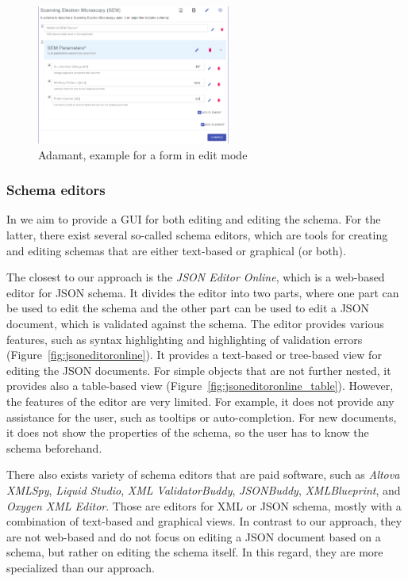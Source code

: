 \begin{figure}[htb]
    \centering
    \includegraphics[width=2.5in]{figures/adamant}
    \caption{Adamant, example for a form in edit mode}
    \label{fig:adamant}
\end{figure}


\subsubsection{Schema editors}\label{subsubsec:schema-editors}
In \toolname{} we aim to provide a GUI for both editing \cfgfiles{} and editing the schema.
For the latter, there exist several so-called schema editors, which are tools for creating and editing schemas that are
either text-based or graphical (or both).

The closest to our approach is the \textit{JSON Editor Online}\cite{jsoneditoronlineJSONEditor}, which is a web-based editor for JSON schema.
It divides the editor into two parts, where one part can be used to edit the schema and the other part can be used to edit a JSON document,
which is validated against the schema.
The editor provides various features, such as syntax highlighting and highlighting of validation errors (Figure~\ref{fig:jsoneditoronline}).
It provides a text-based or tree-based view for editing the JSON documents.
For simple objects that are not further nested, it provides also a table-based view (Figure~\ref{fig:jsoneditoronline_table}).
However, the features of the editor are very limited.
For example, it does not provide any assistance for the user, such as tooltips or auto-completion.
For new documents, it does not show the properties of the schema, so the user has to know the schema beforehand.

There also exists variety of schema editors that are paid software, such as \textit{Altova XMLSpy}\cite{altovaEditorXMLSpy},
\textit{Liquid Studio}\cite{liquidtechnologiesJSONSchema}, \textit{XML ValidatorBuddy}\cite{xmlbuddyEditorValidator},
\textit{JSONBuddy}\cite{jsonbuddyJSONSchema}, \textit{XMLBlueprint}\cite{xmlblueprintEditorXMLBlueprint},
and \textit{Oxygen XML Editor}\cite{oxygenxmlCompleteSolution}.
Those are editors for XML or JSON schema, mostly with a combination of text-based and graphical views.
In contrast to our approach, they are not web-based and do not focus on editing a JSON document based on a schema,
but rather on editing the schema itself.
In this regard, they are more specialized than our approach.

